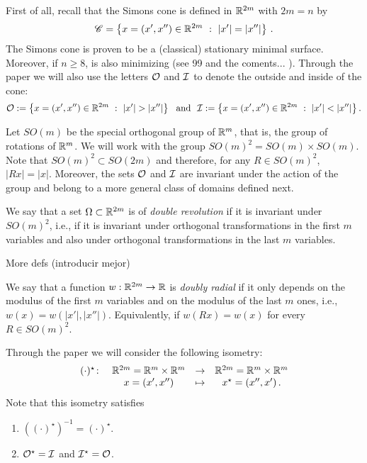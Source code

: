 First of all, recall that the Simons cone is defined in $\mathbb{R}^{2m}$ with $2m = n$ by
\begin{equation}
\label{Eq:SimonsCone}
	\mathscr{C} = \left \{ x = (x', x'') \in \mathbb{R}^{2m} \ : \ |x'| = |x''| \right \}\,.
\end{equation}
The Simons cone is proven to be a (classical) stationary minimal surface. Moreover, if $n\geq 8$, is also minimizing (see 99 and the coments... ). 
Through the paper we will also use the letters $\mathcal{O}$ and $\mathcal{I}$ to denote the outside and inside of the cone:
\begin{equation}
\label{Eq:DefOandI}
\mathcal{O}:= \left \{ x = (x', x'') \in \mathbb{R}^{2m} \ : \ |x'| > |x''| \right \} \ \textrm{ and } \
\mathcal{I}:= \left \{ x = (x', x'') \in \mathbb{R}^{2m} \ : \ |x'| < |x''| \right \}.
\end{equation}


Let $SO(m)$ be the special orthogonal group of $\mathbb{R}^m$, that is, the group of rotations of $\mathbb{R}^m$. We will work with the group $SO(m)^2 = SO(m) \times SO(m)$. Note that $SO(m)^2 \subset SO(2m)$ and therefore, for any $R\in SO(m)^2$, $|Rx| = |x|$. Moreover, the sets $\mathcal{O}$ and $\mathcal{I}$ are invariant under the action of the group and belong to a more general class of domains defined next.

\begin{definition}
\label{Def:DoubleRevolutionSet}
We say that a set $\Omega\subset \mathbb{R}^{2m}$ is of \emph{double revolution} if it is invariant under $SO(m)^2$, i.e., if it is invariant under orthogonal transformations in the first $m$ variables and also under orthogonal transformations in the last $m$ variables.
\end{definition}

More defs (introducir mejor)

\begin{definition}
\label{Def:DoublyRadial}
We say that a function $w:\mathbb{R}^{2m} \to \mathbb{R}$ is \emph{doubly radial} if it only depends on the modulus of the first $m$ variables and on the modulus of the last $m$ ones, i.e., $w(x) = w(|x'|,|x''|)$. Equivalently, if $w(Rx) = w(x)$ for every $R \in SO(m)^2$.
\end{definition}

Through the paper we will consider the following isometry:
\begin{equation}
\label{Eq:DefStar}
\begin{matrix}
(\cdot)^\star \colon & \mathbb{R}^{2m}= \mathbb{R}^{m}\times \mathbb{R}^{m}  &\to&  \mathbb{R}^{2m}= \mathbb{R}^{m}\times \mathbb{R}^{m}  \\
	& x = (x',x'') &\mapsto & x^\star = (x'',x')\,.
\end{matrix}
\end{equation}
Note that this isometry satisfies
\begin{enumerate}
\item $((\cdot)^\star)^{-1} = (\cdot)^\star$.
\item $\mathcal{O}^\star= \mathcal{I}$ and $\mathcal{I}^\star = \mathcal{O}$.
\end{enumerate}


